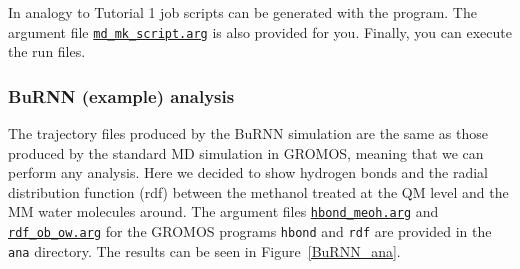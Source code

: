 In analogy to Tutorial 1 job scripts can be generated with the  program. The argument file \href{https://github.com/LierB/gromos_tutorial_livecoms/blob/burnn_tutorial_rc/tutorial_files/t_06/md_burnn/md_mk_script.arg}{\texttt{md\_mk\_script.arg}} is also provided for you. Finally, you can execute the run files.


\subsubsection{BuRNN (example) analysis}
The trajectory files produced by the BuRNN simulation are the same as those produced by the standard MD simulation in GROMOS, meaning that we can perform any analysis. Here we decided to show hydrogen bonds and the radial distribution function (rdf) between the methanol treated at the QM level and the MM water molecules around. The argument files \href{https://github.com/LierB/gromos_tutorial_livecoms/blob/burnn_tutorial_rc/tutorial_files/t_06/md_burnn/ana/hbond/hbond_meoh.arg}{\texttt{hbond\_meoh.arg}} and \href{https://github.com/LierB/gromos_tutorial_livecoms/blob/burnn_tutorial_rc/tutorial_files/t_06/md_burnn/ana/rdf/rdf_ob_ow.arg}{\texttt{rdf\_ob\_ow.arg}} for the GROMOS programs \texttt{hbond} and \texttt{rdf} are provided in the \texttt{ana} directory. 
The results can be seen in Figure~\ref{BuRNN_ana}.

